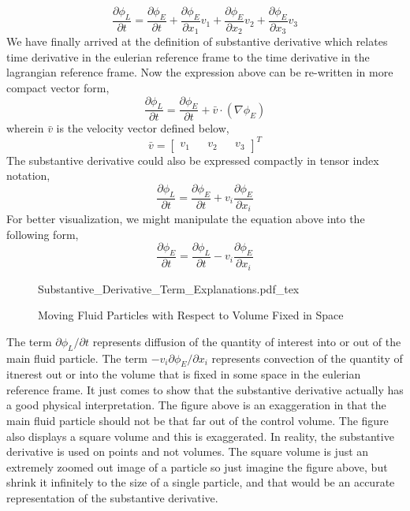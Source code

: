 $$\frac{\partial \phi_{L}}{\partial t} = \frac{\partial \phi_{E}}{\partial t} + \frac{\partial \phi_{E}}{\partial x_{1}}v_{1} + \frac{\partial \phi_{E}}{\partial x_{2}}v_{2} + \frac{\partial \phi_{E}}{\partial x_{3}}v_{3}$$
We have finally arrived at the definition of substantive derivative which relates time derivative in the eulerian reference frame to the time derivative in the lagrangian reference frame.
Now the expression above can be re-written in more compact vector form,
\begin{equation}\frac{\partial \phi_{L}}{\partial t} = \frac{\partial \phi_{E}}{\partial t} + \bar{v}\cdot(\nabla \phi_{E}) \label{Substantive Derivative Final Vector Notation}\end{equation}
wherein $\bar{v}$ is the velocity vector defined below,
$$\bar{v} = \begin{bmatrix}
v_{1} && v_{2} && v_{3}
\end{bmatrix}^{T}$$
The substantive derivative could also be expressed compactly in tensor index notation,
\begin{equation}\frac{\partial \phi_{L}}{\partial t} = \frac{\partial \phi_{E}}{\partial t} + v_{i}\frac{\partial \phi_{E}}{\partial x_{i}} \label{Substantive Derivative Final Tensor Index Notation}\end{equation}
For better visualization, we might manipulate the equation above into the following form,
$$\frac{\partial \phi_{E}}{\partial t} = \frac{\partial \phi_{L}}{\partial t} - v_{i}\frac{\partial \phi_{E}}{\partial x_{i}}$$
\begin{figure}[H]\centering
\def\svgwidth{480px}
{Substantive_Derivative_Term_Explanations.pdf_tex}
\caption{Moving Fluid Particles with Respect to Volume Fixed in Space}
\label{Control Volume Eulerian Lagrangian Substantive Derivative}
\end{figure}
The term $\partial \phi_{L}/\partial t$ represents diffusion of the quantity of interest into or out of the main fluid particle.
The term $-v_{i}\partial \phi_{E}/\partial x_{i}$ represents convection of the quantity of itnerest out or into the volume that is fixed in some space in the eulerian reference frame.
It just comes to show that the substantive derivative actually has a good physical interpretation.
The figure above is an exaggeration in that the main fluid particle should not be that far out of the control volume.
The figure also displays a square volume and this is exaggerated.
In reality, the substantive derivative is used on points and not volumes.
The square volume is just an extremely zoomed out image of a particle so just imagine the figure above, but shrink it infinitely to the size of a single particle, and that would be an accurate representation of the substantive derivative.
